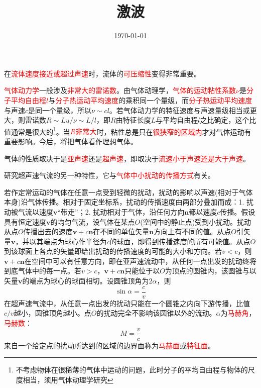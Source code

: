 \documentclass[12pt,a4paper]{article}
\title{激波}
\author{}
\date{\today}
\renewcommand{\vec}[1]{\boldsymbol{#1}}
\begin{document}
\maketitle

在\textcolor{red}{流体速度接近或超过声速}时，流体的\textcolor{red}{可压缩性}变得非常重要。

\textcolor{red}{气体动力学}一般涉及\textcolor{red}{非常大的雷诺数}。由气体动理学，\textcolor{red}{气体的运动粘性系数$\nu$}是\textcolor{red}{分子平均自由程$l$}与\textcolor{red}{分子热运动平均速度}的乘积同一个量级，而\textcolor{red}{分子热运动平均速度}与声速$c$是同一个量级，所以$\nu \sim cl$。若气体动力学的特征速度与声速量级相当或更大，则雷诺数$R \sim Lu/\nu \sim L/l$，即$R$由特征长度$L$与平均自由程$l$之比确定，这个比值通常是很大的\footnote{不考虑物体在很稀薄的气体中运动的问题，此时分子的平均自由程与物体的尺度相当，须用气体动理学研究}。当\textcolor{red}{$R$非常大}时，粘性总是只在\textcolor{red}{很狭窄的区域内}才对气体运动有重要影响。今后，将把气体看作理想气体。

气体的性质取决于是\textcolor{red}{亚声速}还是\textcolor{red}{超声速}，即取决于\textcolor{red}{流速小于声速还是大于声速}。

研究超声速气流的另一种特性，它与\textcolor{red}{气体中小扰动的传播方式}有关。

若作定常运动的气体在任意一点受到轻微的扰动，扰动的影响以声速(相对于气体本身)沿气体传播。相对于固定坐标系，扰动的传播速度由两部分叠加而成：1. 扰动被气流以速度$\vec{v}$“带走”；2. 扰动相对于气体，沿任何方向$\vec{n}$都以速度$c$传播。假设具有恒定速度$\vec{v}$的均匀气流，设气体在某点$O$(空间中的静止点)受到小扰动。扰动从点$O$传播出去的速度$\vec{v}+c\vec{n}$在不同的单位矢量$\vec{n}$方向上有不同的值。从点$O$引矢量$\vec{v}$，并以其端点为球心作半径为$c$的球面，即得到传播速度的所有可能值。从点$O$到该球面上各点的矢量即给出扰动的传播速度的可能的大小和方向。若$v < c$，则$\vec{v}+c\vec{n}$在空间中可以有任意方向，即在亚声速流动中，从任何一点出发的扰动终将到底气体中的每一点。若$v > c$，$\vec{v}+c\vec{n}$只能位于以$O$为顶点的圆锥内，该圆锥与以矢量$\vec{v}$的端点为球心的球面相切。设圆锥顶角为$2\alpha$，则
\begin{equation}
\sin \alpha  = \frac{c}{v}
\end{equation}
在超声速气流中，从任意一点出发的扰动只能在一个圆锥之内向下游传播，比值$c/v$越小，圆锥顶角越小。点$O$的扰动完全不影响该圆锥以外的流动。$\alpha$为\textcolor{red}{马赫角}，\textcolor{red}{马赫数}：
\begin{equation}
M = \frac{v}{c}
\end{equation}
来自一个给定点的扰动所达到的区域的边界面称为\textcolor{red}{马赫面}或\textcolor{red}{特征面}。
\end{document}
